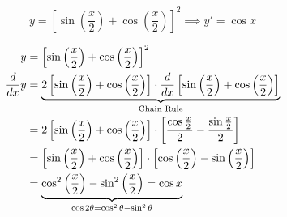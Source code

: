 \documentclass[14pt,fleqn]{extarticle}
\newcommand\expa{\sin \left(\frac{x}{2} \right)}
\newcommand\expb{\cos \left(\frac{x}{2} \right)}
\newcommand\expc{ \left[\expa + \expb \right]}
\begin{document}
 
\begin{snippet}
    \correct
    
    \[ y = \left[\expa + \expb \right]^2\implies y' = \cos x\]    
    
    \reason
    
    \smallmath
    \begin{align}
	y &= \left[\expa + \expb \right]^2  \\
	\ddx{y} &= \underbrace{2\expc\cdot\ddx \expc}_{\text{Chain Rule}} \\
	&= 2\expc \cdot \left[\frac{\cos\frac{x}{2}}{2} - \frac{\sin\frac{x}{2}}{2} \right] \\
	&= \left[\expa + \expb \right]\cdot \left[\expb - \expa \right] \\
	&= \underbrace{\cos^2 \left(\frac{x}{2} \right) - \sin^2 \left(\frac{x}{2} \right) = \cos x}_{\cos 2\theta = \cos^2\theta - \sin^2\theta}
\end{align}
    
\end{snippet} 
\end{document}
